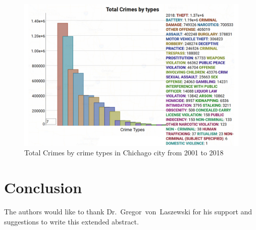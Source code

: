 \begin{figure}[htb]
	\centering\includegraphics[width=\columnwidth]{../images/stat2.jpg}
	\caption{Total Crimes by crime types in Chichago city from 2001 to 2018}\label{fig:year-top10crimes-local}
\end{figure}

\section{Conclusion} 

\begin{acks}
	
The authors would like to thank Dr.~Gregor~von~Laszewski for his
support and suggestions to write this extended abstract.
	
\end{acks}


 
